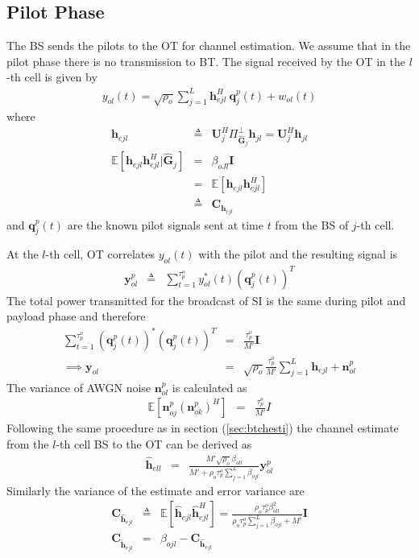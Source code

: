 \documentclass[10pt, a4paper, twoside,fleqn]{article}
\begin{document}
\subsection{Pilot Phase}
	The BS sends the pilots to the OT for channel estimation. We assume that in the pilot phase there is no transmission to BT.
The signal received by the OT in the $l$-th cell is given by
\begin{eqnarray}
	y_{ol}(t)=\sqrt{\rho_o} \sum_{j=1}^{L} \pmb{h}^H_{ejl} \ \pmb{q}^p_{j}(t) + w_{ol}(t) 
\end{eqnarray}
where
\begin{eqnarray}
	\pmb{h}_{ejl} &\triangleq& \pmb{U}_j^H\Pi^{\perp}_{{\hat{\pmb{G}}_j}}\pmb{h}_{jl} = \pmb{U}_j^H\pmb{h}_{jl} \\
    \mathbb{E}[\pmb{h}_{ejl}\pmb{h}^H_{ejl}|\pmb{\hat G}_j] &=& \beta_{oJl}\pmb{I} \nonumber \\
			                     &=& \mathbb{E}[\pmb{h}_{ejl}\pmb{h}^H_{ejl}] \nonumber \\
                                           &\triangleq& \pmb{C}_{\pmb{h}_{ejl}} \nonumber
\end{eqnarray}
and $\pmb{q}_j^p(t)$ are the known pilot signals sent at time $t$ from the BS of $j$-th cell.

At the $l$-th cell, OT correlates $y_{ol}(t)$ with the pilot and the resulting signal is
\begin{eqnarray}
	\pmb{y}_{ol}^{p} &\triangleq& \sum_{t=1}^{\tau_p^o} y_{ol}^*(t)(\pmb{q}^{p}_{j}(t))^T \nonumber
\end{eqnarray}
The total power transmitted for the broadcast of SI is the same during pilot and payload phase and therefore
\begin{eqnarray}
    \sum\limits_{t=1}^{\tau_p^o}(\pmb{q}^p_{j}(t))^*(\pmb{q}^p_{j}(t))^T&=&\frac{\tau_p^o}{M'}\pmb{I} \\
\implies \pmb{y}_{ol} &=& \sqrt{\rho_o}\frac{\tau_p^o}{M'}\sum_{j=1}^{L}\pmb{h}_{ejl}+\pmb{n}^p_{ol}
\end{eqnarray}
The variance of AWGN noise $\pmb{n}_{ol}^p$ is calculated as
\begin{eqnarray}
	\mathbb{E}[\pmb{n}^p_{oj}(\pmb{n}^p_{ok})^H] &=& \frac{\tau_p^o}{M'}I \nonumber
\end{eqnarray}
Following the same procedure as in section (\ref{sec:btchesti}) the channel estimate from the $l$-th cell BS to the OT can be derived as 
\begin{eqnarray}\label{eqn:otchesti}
	\pmb{\hat h}_{ell} &=& \frac{M'\sqrt{\rho_o}\beta_{oll}}{M'+\rho_o\tau_p^o\sum\limits_{j=1}^{L}\beta_{ojl}}\pmb{y}^p_{ol}
\end{eqnarray}
Similarly the variance of the estimate and error variance are
\begin{eqnarray}
	\pmb{C}_{\pmb{\hat h}_{ejl}} &\triangleq& \mathbb{E}[\pmb{\hat h}_{ejl}\pmb{\hat h}^H_{ejl}] = \frac{\rho_o\tau_p^o\beta^2_{oll}}{\rho_o\tau_p^o\sum\limits_{j=1}^{L}\beta_{ojl}+M'}\pmb{I} \\
	\pmb{C}_{\pmb{\widetilde{h}}_{ejl}} &=& \beta_{ojl} - 	\pmb{C}_{\pmb{\hat h}_{ejl}}
\end{eqnarray}
\end{document}
